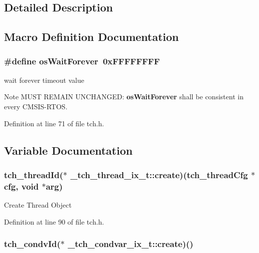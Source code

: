 \subsection{Detailed Description}


\subsection{Macro Definition Documentation}
\hypertarget{group___a_p_i_ga9eb9a7a797a42e4b55eb171ecc609ddb}{
\subsubsection[{os\+Wait\+Forever}]{\setlength{\rightskip}{0pt plus 5cm}\#define os\+Wait\+Forever~0x\+F\+F\+F\+F\+F\+F\+F\+F}}\label{group___a_p_i_ga9eb9a7a797a42e4b55eb171ecc609ddb}


wait forever timeout value 

\begin{DoxyNote}{Note}
M\+U\+S\+T R\+E\+M\+A\+I\+N U\+N\+C\+H\+A\+N\+G\+E\+D\+: {\bfseries os\+Wait\+Forever} shall be consistent in every C\+M\+S\+I\+S-\/\+R\+T\+O\+S. 
\end{DoxyNote}


Definition at line 71 of file tch.\+h.



\subsection{Variable Documentation}
\hypertarget{group___a_p_i_ga3ac33307df56ca2683c30a7055984a17}{
\subsubsection[{create}]{\setlength{\rightskip}{0pt plus 5cm}tch\+\_\+thread\+Id($\ast$ \+\_\+tch\+\_\+thread\+\_\+ix\+\_\+t\+::create)(tch\+\_\+thread\+Cfg $\ast$cfg, void $\ast$arg)}}\label{group___a_p_i_ga3ac33307df56ca2683c30a7055984a17}
Create Thread Object 

Definition at line 90 of file tch.\+h.

\hypertarget{group___a_p_i_ga4baf0cb2e2052176f805437c9d226b56}{
\subsubsection[{create}]{\setlength{\rightskip}{0pt plus 5cm}tch\+\_\+condv\+Id($\ast$ \+\_\+tch\+\_\+condvar\+\_\+ix\+\_\+t\+::create)()}}\label{group___a_p_i_ga4baf0cb2e2052176f805437c9d226b56}


